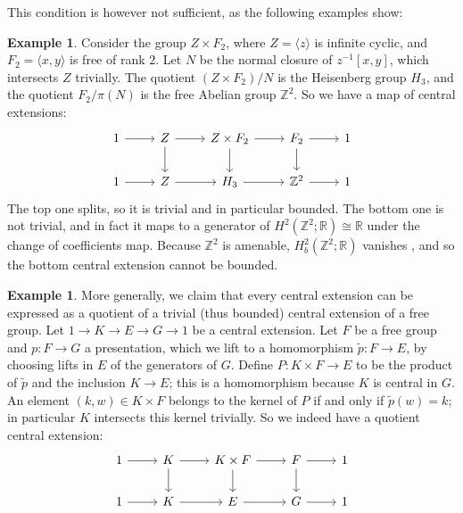\documentclass[svgnames]{amsart}
\theoremstyle{plain}
\theoremstyle{definition}
\newtheorem{ex}[thm]{Example}
\begin{document}
This condition is however not sufficient, as the following examples show:

\begin{ex}
\label{Heisenberg}
    Consider the group $Z \times F_2$, where $Z = \langle z \rangle$ is infinite cyclic, and $F_2 = \langle x, y \rangle$ is free of rank $2$. Let $N$ be the normal closure of $z^{-1}[x, y]$, which intersects $Z$ trivially. The quotient $(Z \times F_2) / N$ is the Heisenberg group $H_3$, and the quotient $F_2 / \pi(N)$ is the free Abelian group $\mathbb{Z}^2$. So we have a map of central extensions:
\[\begin{tikzcd}
	1 & Z & {Z \times F_2} & {F_2} & 1 \\
	1 & Z & {H_3} & {\mathbb{Z}^2} & 1
	\arrow[from=1-1, to=1-2]
	\arrow[from=1-2, to=1-3]
	\arrow[from=1-2, to=2-2]
	\arrow[from=1-3, to=1-4]
	\arrow[from=1-3, to=2-3]
	\arrow[from=1-4, to=1-5]
	\arrow[from=1-4, to=2-4]
	\arrow[from=2-1, to=2-2]
	\arrow[from=2-2, to=2-3]
	\arrow[from=2-3, to=2-4]
	\arrow[from=2-4, to=2-5]
\end{tikzcd}\]
The top one splits, so it is trivial and in particular bounded. The bottom one is not trivial, and in fact it maps to a generator of $H^2(\mathbb{Z}^2; \mathbb{R}) \cong \mathbb{R}$ under the change of coefficients map. Because $\mathbb{Z}^2$ is amenable, $H^2_b(\mathbb{Z}^2; \mathbb{R})$ vanishes \cite[Chapter 3]{frigerio}, and so the bottom central extension cannot be bounded.
\end{ex}

\begin{ex}\label{ex:all_ext_are_quotient}
    More generally, we claim that every central extension can be expressed as a quotient of a trivial (thus bounded) central extension of a free group. Let $1 \to K \to E \to G \to 1$ be a central extension. Let $F$ be a free group and $p \colon F \to G$ a presentation, which we lift to a homomorphism $\tilde{p} \colon F \to E$, by choosing lifts in $E$ of the generators of $G$. Define $P \colon K \times F \to E$ to be the product of $\tilde{p}$ and the inclusion $K \to E$; this is a homomorphism because $K$ is central in $G$. An element $(k, w) \in K \times F$ belongs to the kernel of $P$ if and only if $\tilde{p}(w) = k$; in particular $K$ intersects this kernel trivially. So we indeed have a quotient central extension:
    \[\begin{tikzcd}
	1 & K & {K \times F} & {F} & 1 \\
	1 & K & {E} & {G} & 1
	\arrow[from=1-1, to=1-2]
	\arrow[from=1-2, to=1-3]
	\arrow[from=1-2, to=2-2]
	\arrow[from=1-3, to=1-4]
	\arrow[from=1-3, to=2-3]
	\arrow[from=1-4, to=1-5]
	\arrow[from=1-4, to=2-4]
	\arrow[from=2-1, to=2-2]
	\arrow[from=2-2, to=2-3]
	\arrow[from=2-3, to=2-4]
	\arrow[from=2-4, to=2-5]
\end{tikzcd}\]
\end{ex}
\end{document}

